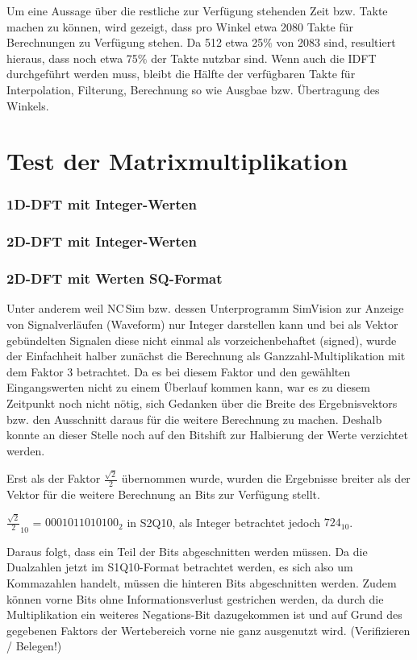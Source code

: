  Um eine Aussage über die restliche zur Verfügung stehenden Zeit bzw. Takte machen zu können, wird gezeigt, dass pro Winkel 
 etwa 2080 Takte für Berechnungen zu Verfügung stehen.
 Da 512 etwa 25$\%$ von 2083 sind, resultiert hieraus, dass noch etwa 75$\%$ der Takte nutzbar sind. Wenn auch die IDFT durchgeführt werden muss, bleibt die Hälfte
 der verfügbaren Takte für Interpolation, Filterung, Berechnung so wie Ausgbae bzw. Übertragung des Winkels.

 
\section{Test der Matrixmultiplikation}


\subsubsection{1D-DFT mit Integer-Werten}
 
\subsubsection{2D-DFT mit Integer-Werten}

\subsubsection{2D-DFT mit Werten SQ-Format}

Unter anderem weil NC\,Sim bzw. dessen Unterprogramm SimVision zur Anzeige von Signalverläufen (Waveform) nur Integer darstellen kann und bei als Vektor gebündelten Signalen 
diese nicht einmal als vorzeichenbehaftet (signed), wurde der Einfachheit halber zunächst die Berechnung als Ganzzahl-Multiplikation mit dem Faktor 3 betrachtet. 
Da es bei diesem Faktor und den gewählten Eingangswerten nicht zu einem 
Überlauf kommen kann, war es zu diesem Zeitpunkt noch nicht nötig, sich Gedanken über die Breite des Ergebnisvektors bzw. den Ausschnitt daraus für die weitere
Berechnung zu machen. Deshalb konnte an dieser Stelle noch auf den Bitshift zur Halbierung der Werte verzichtet werden.

Erst als der Faktor $\frac{\sqrt{2}}{2}$ übernommen wurde, wurden die Ergebnisse breiter als der Vektor für die weitere Berechnung an Bits zur Verfügung stellt.

${\frac{\sqrt{2}}{2}}_{10}$ = $0001011010100_2$ in S2Q10, als Integer betrachtet jedoch $724_{10}$.

Daraus folgt, dass ein Teil der Bits abgeschnitten werden müssen. Da die Dualzahlen jetzt im S1Q10-Format betrachtet werden, es sich also um Kommazahlen handelt,
müssen die hinteren Bits abgeschnitten werden. Zudem können vorne Bits ohne Informationsverlust gestrichen werden, da durch die Multiplikation ein weiteres 
Negations-Bit dazugekommen ist und auf Grund des gegebenen Faktors der Wertebereich vorne nie ganz ausgenutzt wird. (Verifizieren / Belegen!)

 